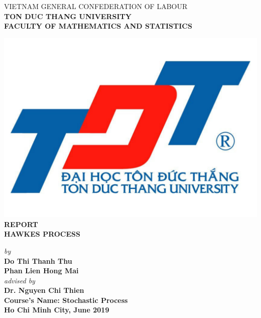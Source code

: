 	\thispagestyle{empty}
	\renewcommand{\baselinestretch}{1.2}
	
	\begin{center}
		\large{VIETNAM GENERAL CONFEDERATION OF LABOUR} \\
		\large{\textbf{TON DUC THANG UNIVERSITY}} \\
		\large{\textbf{FACULTY OF MATHEMATICS AND STATISTICS}} \\
		\vspace*{1cm}
		
		\includegraphics[scale=0.12,bb=0 0 800 600]{TDT_logo.pdf} \\
		\vspace*{1cm}
	\large{\textbf{REPORT}} \\ 
	\LARGE{\textbf{HAWKES PROCESS}} \\
	
	\vspace*{1cm}
	
	\Large{\textit{by}} \\
	\Large{\textbf{Do Thi Thanh Thu}}\\
	\Large{\textbf{Phan Lien Hong Mai}}\\
	\Large{\textit{advised by}} \\
	\Large{\textbf{Dr. Nguyen Chi Thien}} \\
	\vspace{2.5cm}
	   \Large{\textbf{Course's Name: Stochastic Process}} \\
	\vspace{1cm}
	\Large{\textbf{Ho Chi Minh City, June 2019}}
		
	\end{center}
	
